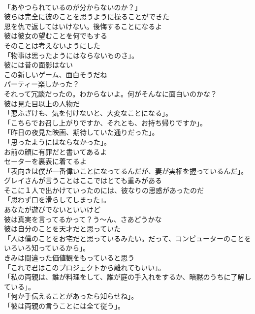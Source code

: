 \documentclass[8pt]{extreport}
\begin{document}
\begin{CJK}{UTF8}{min}
\\	「あやつられているのが分からないのか？」	
\\	彼らは完全に彼のことを思うように操ることができた	
\\	恩を仇で返してはいけない。後悔することになるよ	
\\	彼は彼女の望むことを何でもする	
\\	そのことは考えないようにした	
\\	「物事は思ったようにはならないものさ」。	
\\	彼には昔の面影はない	
\\	この新しいゲーム、面白そうだね	
\\	パーティー楽しかった？	
\\	それって冗談だったの。わからないよ。何がそんなに面白いのかな？	
\\	彼は見た目以上の人物だ	
\\	「悪ふざけも、気を付けないと、大変なことになる」。	
\\	「こちらでお召し上がりですか、それとも、お持ち帰りですか」。	
\\	「昨日の夜見た映画、期待していた通りだった」。	
\\	「思ったようにはならなかった」。	
\\	お前の顔に有罪だと書いてあるよ	
\\	セーターを裏表に着てるよ	
\\	「表向きは僕が一番偉いことになってるんだが、妻が実権を握っているんだ」。	
\\	グレイさんが言うことはここではとても重みがある	
\\	そこに１人で出かけていったのには、彼なりの思惑があったのだ	
\\	「思わず口を滑らしてしまった」。	
\\	あなたが遊びでないといいけど	
\\	彼は真実を言ってるかって？う～ん、さあどうかな	
\\	彼は自分のことを天才だと思っていた	
\\	「人は僕のことをお宅だと思っているみたい。だって、コンピューターのことをいろいろ知っているから」。	
\\	きみは間違った価値観をもっていると思う	
\\	「これで君はこのプロジェクトから離れてもいい」。	
\\	「私の両親は、誰が料理をして、誰が庭の手入れをするか、暗黙のうちに了解している」。	
\\	「何か手伝えることがあったら知らせね」。	
\\	「彼は両親の言うことには全て従う」。	

\end{CJK}
\end{document}

